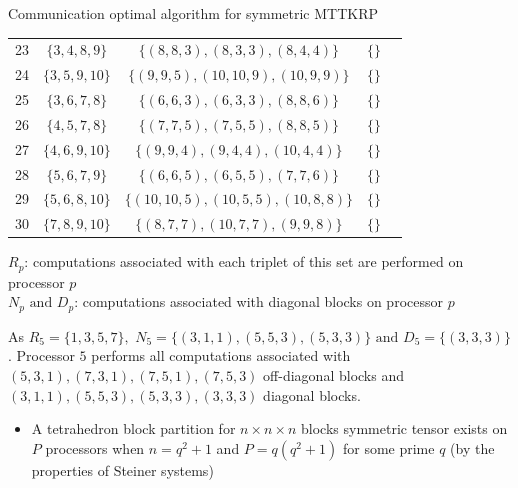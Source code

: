 \documentclass[final]{beamer}
\newlength{\colwidth}
\begin{document}
\begin{frame}[t]
\begin{columns}[t]
\begin{column}{\colwidth}
\begin{block}{Communication optimal algorithm for symmetric MTTKRP}
\begin{center}
{\begin{tabular}{|c|c|c|c|c|}
		23 & $\{3,4,8,9\}$ & $\{(8,8,3),(8,3,3),(8,4,4)\}$ & $\{\}$ \\
		24 & $\{3,5,9,10\}$ & $\{(9,9,5),(10,10,9),(10,9,9)\}$ & $\{\}$ \\
		25 & $\{3,6,7,8\}$ & $\{(6,6,3),(6,3,3),(8,8,6)\}$ & $\{\}$ \\
		26 & $\{4,5,7,8\}$ & $\{(7,7,5),(7,5,5),(8,8,5)\}$ & $\{\}$ \\
		27 & $\{4,6,9,10\}$ & $\{(9,9,4),(9,4,4),(10,4,4)\}$ & $\{\}$ \\
		28 & $\{5,6,7,9\}$ & $\{(6,6,5),(6,5,5),(7,7,6)\}$ & $\{\}$ \\
		29 & $\{5,6,8,10\}$ & $\{(10,10,5),(10,5,5),(10,8,8)\}$ & $\{\}$ \\
		30 & $\{7,8,9,10\}$ & $\{(8,7,7),(10,7,7),(9,9,8)\}$ & $\{\}$ \\
		\hline
	\end{tabular}
}
\end{center}

$R_p$: computations associated with each triplet of this set are performed on processor $p$\\
$N_p \text{ and } D_p$: computations associated with diagonal blocks on processor $p$


As $R_5= \{1,3,5,7\},$  $N_5 = \{(3,1,1),(5,5,3),(5,3,3)\} \text{ and } D_5 = \{(3,3,3)\}$. Processor $5$ performs all computations associated with $(5,3,1), (7,3,1), (7,5,1), (7,5,3)$ off-diagonal blocks and $(3,1,1),(5,5,3),(5,3,3), (3,3,3)$ diagonal blocks.  

\vspace*{-0.25cm}
\begin{itemize}
	\item A tetrahedron block partition for $n \times n \times n$ blocks symmetric tensor exists on $P$ processors when $n=q^2+1$ and $P=q(q^2+1)$ for some prime $q$ (by the properties of Steiner systems) 
\end{itemize}


\end{block}
\end{column}
\end{columns}
\end{frame}
\end{document}
